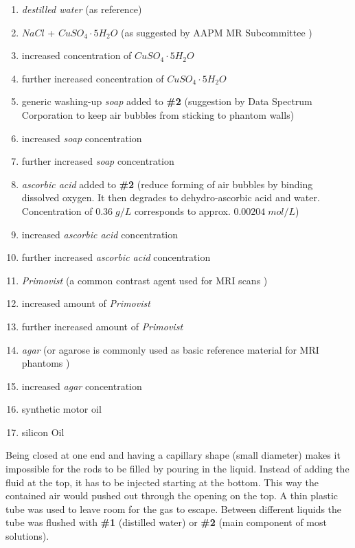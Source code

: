 \newpage
\begin{enumerate}[label=\textbf{\#\arabic*}]
 \item \textit{destilled water} (as reference)
 \item $NaCl$ + $CuSO_4\cdot5H_2O$ (as suggested by AAPM MR Subcommittee \cite{Jackson2009})
 \item increased concentration of $CuSO_4\cdot5H_2O$
 \item further increased concentration of $CuSO_4\cdot5H_2O$
 \item generic washing-up \textit{soap} added to \textbf{\#2} (suggestion by Data Spectrum Corporation \cite{bubbles} to keep air bubbles from sticking to phantom walls)
 \item increased \textit{soap} concentration
 \item further increased \textit{soap} concentration
 \item \textit{ascorbic acid} added to \textbf{\#2} (reduce forming of air bubbles by binding dissolved oxygen. It then degrades to dehydro-ascorbic acid and water.
  \cite{Abtahi2008, Bodannes1979} Concentration of $0.36 \; g/L$ corresponds to approx. $0.00204 \; mol/L$)
 \item increased \textit{ascorbic acid} concentration
 \item further increased \textit{ascorbic acid} concentration
 \item \textit{Primovist} (a common contrast agent used for MRI scans \cite{VanBeers2012, Rohrer, primovist})
 \item increased amount of \textit{Primovist}
 \item further increased amount of \textit{Primovist}
 \item \textit{agar} (or agarose is commonly used as basic reference material for MRI phantoms \cite{BuccioliniCiraolo1989, Mathur-DeVre1985})
 \item increased \textit{agar} concentration
 \item synthetic motor oil
 \item silicon Oil
\end{enumerate}


Being closed at one end and having a capillary shape (small diameter) makes it impossible for the rods to be filled by pouring in the liquid.
Instead of adding the fluid at the top, it has to be injected starting at the bottom.
This way the contained air would pushed out through the opening on the top.
A thin plastic tube was used to leave room for the gas to escape.
Between different liquids the tube was flushed with \textbf{\#1} (distilled water) or \textbf{\#2} (main component of most solutions).

